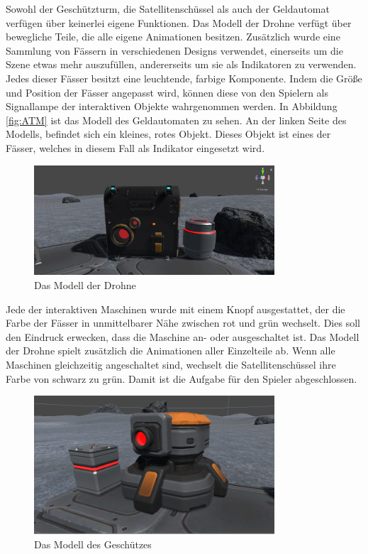 Sowohl der Geschützturm, die Satellitenschüssel als auch der Geldautomat verfügen über keinerlei eigene Funktionen. Das Modell der Drohne verfügt über bewegliche Teile, die alle eigene Animationen besitzen. Zusätzlich wurde eine Sammlung von Fässern in verschiedenen Designs verwendet, einerseits um die Szene etwas mehr auszufüllen, andererseits um sie als Indikatoren zu verwenden. Jedes dieser Fässer besitzt eine leuchtende, farbige Komponente. Indem die Größe und Position der Fässer angepasst wird, können diese von den Spielern als Signallampe der interaktiven Objekte wahrgenommen werden. In Abbildung \ref{fig:ATM} ist das Modell des Geldautomaten zu sehen. An der linken Seite des Modells, befindet sich ein kleines, rotes Objekt. Dieses Objekt ist eines der Fässer, welches in diesem Fall als Indikator eingesetzt wird. 

\begin{figure}[H]
\centering
\includegraphics[width=0.8\textwidth]{Drone.PNG}
\caption{Das Modell der Drohne}
\end{figure}

Jede der interaktiven Maschinen wurde mit einem Knopf ausgestattet, der die Farbe der Fässer in unmittelbarer Nähe zwischen rot und grün wechselt. Dies soll den Eindruck erwecken, dass die Maschine an- oder ausgeschaltet ist. Das Modell der Drohne spielt zusätzlich die Animationen aller Einzelteile ab. Wenn alle Maschinen gleichzeitig angeschaltet sind, wechselt die Satellitenschüssel ihre Farbe von schwarz zu grün. Damit ist die Aufgabe für den Spieler abgeschlossen.\newline

\begin{figure}[H]
\centering
\includegraphics[width=0.8\textwidth]{Turret.PNG}
\caption{Das Modell des Geschützes}
\end{figure}

